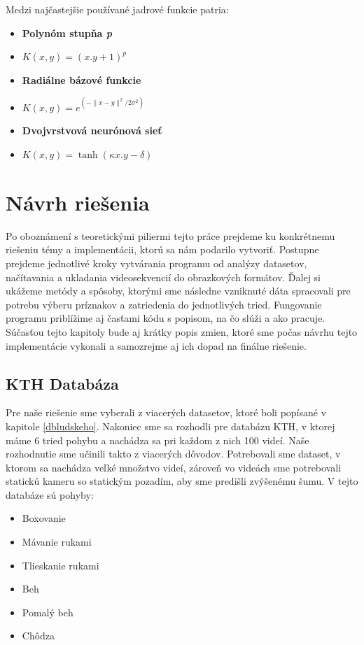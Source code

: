 Medzi najčastejšie používané jadrové funkcie patria:

\begin{itemize}
\item \textbf{Polynóm stupňa \textit{p}}
\item $  K(x,y) = (x.y + 1)^p $
\item \textbf{Radiálne bázové funkcie}
\item $   K(x,y) = e^{(-\|x-y\|^2/2\sigma^2)}  $
\item \textbf{Dvojvrstvová neurónová sieť }
\item $   K(x,y) = \tanh(\kappa x.y - \delta)  $
\end{itemize}



\newpage

\section{Návrh riešenia}
Po oboznámení s teoretickými piliermi tejto práce prejdeme ku konkrétnemu riešeniu témy a implementácii, ktorú sa nám podarilo vytvoriť. Postupne prejdeme jednotlivé kroky vytvárania programu od analýzy datasetov, načítavania a ukladania videosekvencií do obrazkových formátov. Ďalej si ukážeme metódy a spôsoby, ktorými sme následne vzniknuté dáta spracovali pre potrebu výberu príznakov a zatriedenia do jednotlivých tried. Fungovanie programu priblížime aj časťami kódu s popisom, na čo slúži a ako pracuje. Súčasťou tejto kapitoly bude aj krátky popis zmien, ktoré sme počas návrhu tejto implementácie vykonali a samozrejme aj ich dopad na finálne riešenie.

\subsection{KTH Databáza}
Pre naše riešenie sme vyberali z viacerých datasetov, ktoré boli popísané v kapitole \ref{dbludskeho}. Nakoniec sme sa rozhodli pre databázu KTH, v ktorej máme 6 tried pohybu a nachádza sa pri každom z nich 100 videí. Naše rozhodnutie sme učinili takto z viacerých dôvodov. Potrebovali sme dataset, v ktorom sa nachádza veľké množstvo videí, zároveň vo videách sme potrebovali statickú kameru so statickým pozadím, aby sme predišli zvýšenému šumu. V tejto databáze sú pohyby:

\begin{itemize}
\item Boxovanie
\item Mávanie rukami
\item Tlieskanie rukami
\item Beh
\item Pomalý beh
\item Chôdza
\end{itemize}

